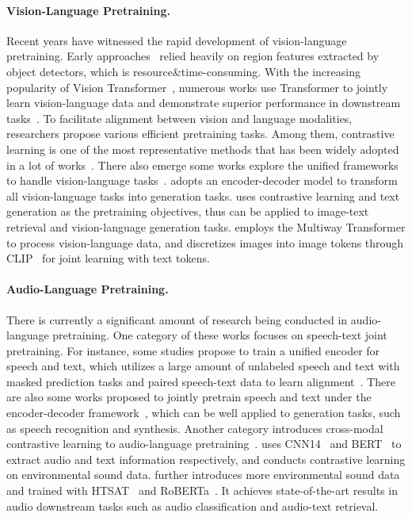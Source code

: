\documentclass{article}
\begin{document}
\paragraph{Vision-Language Pretraining.}
Recent years have witnessed the rapid development of vision-language pretraining. 
Early approaches~\cite{vlbert,vilbert,visualbert,uniter,interbert,oscar,vinvl,unimo,vlt5,m6} relied heavily on region features extracted by object detectors, which is resource\&time-consuming. 
With the increasing popularity of Vision Transformer~\cite{vit}, numerous works use Transformer to jointly learn vision-language data and demonstrate superior performance in downstream tasks~\cite{vilt,albef,meter,vlmo,fiber,lemon,blip,blip2,mplug2}. 
To facilitate alignment between vision and language modalities, researchers propose various efficient pretraining tasks.
Among them, contrastive learning is one of the most representative methods that has been widely adopted in a lot of works~\cite{clip,align,lit,florence,simclr,moco,albef,chinese_clip}.
There also emerge some works explore the unified frameworks to handle vision-language tasks~\cite{ofa,simvlm,git,uni-perceiver,flava,coca,beit3,pali,metalm,unified_io}. \cite{ofa} adopts an encoder-decoder model to transform all vision-language tasks into generation tasks. 
\cite{coca} uses contrastive learning and text generation as the pretraining objectives, thus can be applied to image-text retrieval and vision-language generation tasks. 
\cite{beit3} employs the Multiway Transformer to process vision-language data, and discretizes images into image tokens through CLIP~\cite{clip} for joint learning with text tokens.

\paragraph{Audio-Language Pretraining.}

There is currently a significant amount of research being conducted in audio-language pretraining.
One category of these works focuses on speech-text joint pretraining. For instance, some studies propose to train a unified encoder for speech and text, which utilizes a large amount of unlabeled speech and text with masked prediction tasks and paired speech-text data to learn alignment~\cite{slam,mslam,maestro,speechlm}. 
There are also some works proposed to jointly pretrain speech and text under the encoder-decoder framework~\cite{speecht5,stpt,speechut,mmspeech}, which can be well applied to generation tasks, such as speech recognition and synthesis. 
Another category introduces cross-modal contrastive learning to audio-language pretraining~\cite{audioclip,clap,wav2clip,laion_clap}. \cite{clap} uses CNN14~\cite{panns} and BERT~\cite{bert} to extract audio and text information respectively, and conducts contrastive learning on environmental sound data. 
\cite{laion_clap} further introduces more environmental sound data and trained with HTSAT~\cite{htsat} and RoBERTa~\cite{roberta}. 
It achieves state-of-the-art results in audio downstream tasks such as audio classification and audio-text retrieval.
\end{document}
